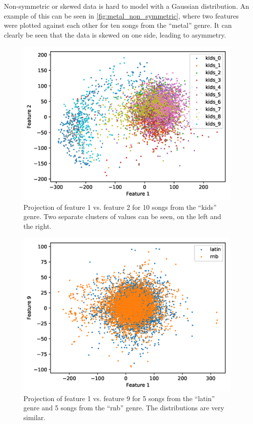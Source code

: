 \documentclass[a4paper,titlepage]{article}
\begin{document}
	Non-symmetric or skewed data is hard to model with a Gaussian distribution. An example of this can be seen in \autoref{fig:metal_non_symmetric}, where two features were plotted against each other for ten songs from the ``metal'' genre. It can clearly be seen that the data is skewed on one side, leading to asymmetry.
	
	
	\begin{figure}[!htb]
		\centering
		\includegraphics[width=\columnwidth]{plots/kids_cluster.png}
		\caption
		{Projection of feature 1 vs. feature 2 for 10 songs from the ``kids'' genre. Two separate clusters of values can be seen, on the left and the right.}
		\label{fig:kids_cluster}
	\end{figure}

	\begin{figure}[!htb]
		\centering
		\includegraphics[width=\columnwidth]{plots/latin_rnb_similarity.png}
		\caption
		{Projection of feature 1 vs. feature 9 for 5 songs from the ``latin'' genre and 5 songs from the ``rnb'' genre. The distributions are very similar.}
		\label{fig:latin_rnb_similarity}
	\end{figure}
\end{document}
